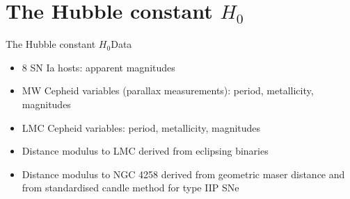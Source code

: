 \documentclass{beamer}
\begin{document}
\section{The Hubble constant $H_0$}

\begin{frame}{The Hubble constant $H_0$}{Data}
\begin{itemize}
\item 8 SN Ia hosts: apparent magnitudes
\item MW Cepheid variables (parallax measurements): period, metallicity, magnitudes
\item LMC Cepheid variables: period, metallicity, magnitudes
\item Distance modulus to LMC derived from eclipsing binaries
\item Distance modulus to NGC 4258 derived from geometric maser distance and from standardised candle method for type IIP SNe   
\end{itemize}  
\end{frame}
\end{document}
